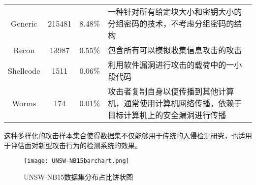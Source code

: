 \begin{table}[h]
\begin{tabularx}{\textwidth}{@{}cccX@{}}
		Generic                         & 215481                          & 8.48\%                              & 一种针对所有给定块大小和密钥大小的分组密码的技术，不考虑分组密码的结构              \\

		Recon                           & 13987                           & 0.55\%                              & 包含所有可以模拟收集信息攻击的攻击                                \\

		Shellcode                       & 1511                            & 0.06\%                              & 利用软件漏洞进行攻击的载荷中的一小段代码                             \\

		Worms                           & 174                             & 0.01\%                              & 攻击者复制自身以便传播到其他计算机，通常使用计算机网络传播，依赖于目标计算机上的安全漏洞进行传播 \\
		\bottomrule
	\end{tabularx}
\end{table}
这种多样化的攻击样本集合使得数据集不仅能够用于传统的入侵检测研究，也适用于评估面对新型攻击行为的检测系统的效果。
\begin{figure}[h]
	\centering
	\texttt{[image: UNSW-NB15barchart.png]}
	\caption{UNSW-NB15数据集分布占比饼状图}
	\label{fig:UNSW-NB15barchart}
\end{figure}


